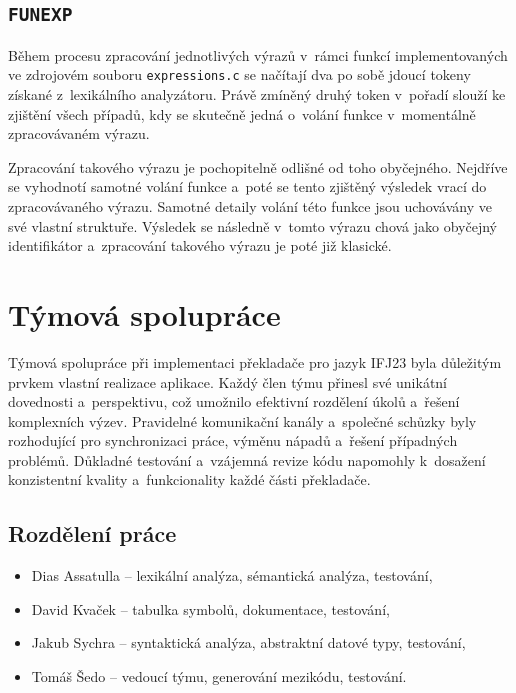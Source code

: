 \documentclass[a4paper, 11pt]{article}
\begin{document}
\subsection{\texttt{FUNEXP}}
    Během procesu zpracování jednotlivých výrazů v~rámci funkcí implementovaných ve zdrojovém souboru \texttt{expressions.c} se načítají dva po sobě jdoucí tokeny získané z~lexikálního analyzátoru.
    Právě zmíněný druhý token v~pořadí slouží ke zjištění všech případů, kdy se skutečně jedná o~volání funkce v~momentálně zpracovávaném výrazu.
    
    Zpracování takového výrazu je pochopitelně odlišné od toho obyčejného.
    Nejdříve se vyhodnotí samotné volání funkce a~poté se tento zjištěný výsledek vrací do zpracovávaného výrazu.
    Samotné detaily volání této funkce jsou uchovávány ve své vlastní struktuře.
    Výsledek se následně v~tomto výrazu chová jako obyčejný identifikátor a~zpracování takového výrazu je poté již klasické.

\newpage

\section{Týmová spolupráce}
    Týmová spolupráce při implementaci překladače pro jazyk IFJ23 byla důležitým prvkem vlastní realizace aplikace.
    Každý člen týmu přinesl své unikátní dovednosti a~perspektivu, což umožnilo efektivní rozdělení úkolů a~řešení komplexních výzev.
    Pravidelné komunikační kanály a~společné schůzky byly rozhodující pro synchronizaci práce, výměnu nápadů a~řešení případných problémů.
    Důkladné testování a~vzájemná revize kódu napomohly k~dosažení konzistentní kvality a~funkcionality každé části překladače.

\subsection{Rozdělení práce}
    \begin{itemize}
        \item Dias Assatulla -- lexikální analýza, sémantická analýza, testování,
        \item David Kvaček -- tabulka symbolů, dokumentace, testování,
        \item Jakub Sychra -- syntaktická analýza, abstraktní datové typy, testování,
        \item Tomáš Šedo -- vedoucí týmu, generování mezikódu, testování.
    \end{itemize}
\end{document}
